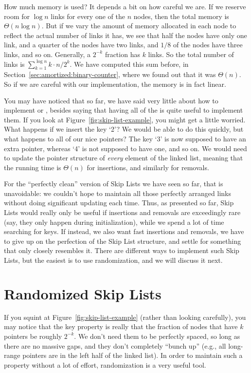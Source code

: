 How much memory is used? It depends a bit on how careful we are. 
If we reserve room for $\log n$ links for every one of the $n$ nodes,
then the total memory is $\Theta(n \log n)$.  
But if we vary the amount of memory allocated in each node to reflect
the actual number of links it has, we see that half the nodes have
only one link, and a quarter of the nodes have two links, and $1/8$ of
the nodes have three links, and so on. Generally, a $2^{-k}$ fraction
has $k$ links. So the total number of links is
$\sum_{k=1}^{\log n} k \cdot n/2^{k}$. We have computed this sum
before, in Section~\ref{sec:amortized:binary-counter}, where we found
out that it was $\Theta(n)$. So if we are careful with our
implementation, the memory is in fact linear.

You may have noticed that so far, we have said very little about how
to implement  or , besides saying that having
all of the  is quite useful to implement them.
If you look at Figure~\ref{fig:skip-list-example}, you might get a
little worried. What happens if we insert the key `2'?
We would be able to do this quickly, but what happens to all of our
nice pointers? The key `3' is now supposed to have an extra pointer,
whereas `4' is not supposed to have one, and so on. We would need to
update the pointer structure of \emph{every} element of the linked
list, meaning that the running time is $\Theta(n)$ for insertions, and
similarly for removals.

For the ``perfectly clean'' version of Skip Lists we have seen so far,
that is unavoidable: we couldn't hope to maintain all those perfectly
arranged links without doing significant updating each time. 
Thus, as presented so far, Skip Lists would really only be useful if
insertions and removals are exceedingly rare (say, they only happen
during initialization), while we spend a lot of time searching for
keys. If instead, we also want fast insertions and removals, we have
to give up on the perfection of the Skip List structure, and settle
for something that only closely resembles it. There are different ways
to implement such Skip Lists, but the easiest is to use randomization,
and we will discuss it next.

\section{Randomized Skip Lists}
If you squint at Figure~\ref{fig:skip-list-example} (rather than
looking carefully), you may notice that the key property is really
that the fraction of nodes that have $k$ pointers be roughly $2^{-k}$. 
We don't need them to be perfectly spaced, so long as there are no
massive gaps, and they don't completely ``bunch up'' (e.g., all
long-range pointers are in the left half of the linked list).
In order to maintain such a property without a lot of effort,
randomization is a very useful tool.

